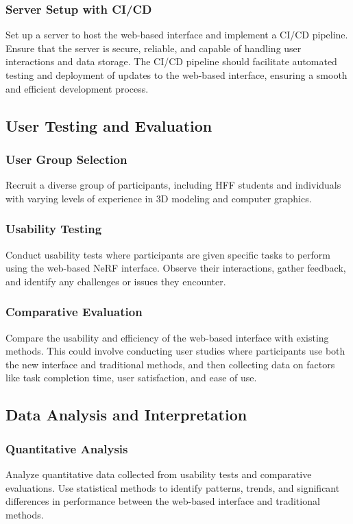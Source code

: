 \subsubsection{Server Setup with CI/CD}
Set up a server to host the web-based interface and implement a CI/CD pipeline. Ensure that the server is secure, reliable, and capable of handling user interactions and data storage. The CI/CD pipeline should facilitate automated testing and deployment of updates to the web-based interface, ensuring a smooth and efficient development process.

\subsection{User Testing and Evaluation}

\subsubsection{User Group Selection}
Recruit a diverse group of participants, including HFF students and individuals with varying levels of experience in 3D modeling and computer graphics.

\subsubsection{Usability Testing}
Conduct usability tests where participants are given specific tasks to perform using the web-based NeRF interface. Observe their interactions, gather feedback, and identify any challenges or issues they encounter.

\subsubsection{Comparative Evaluation}
Compare the usability and efficiency of the web-based interface with existing methods. This could involve conducting user studies where participants use both the new interface and traditional methods, and then collecting data on factors like task completion time, user satisfaction, and ease of use.

\subsection{Data Analysis and Interpretation}

\subsubsection{Quantitative Analysis}
Analyze quantitative data collected from usability tests and comparative evaluations. Use statistical methods to identify patterns, trends, and significant differences in performance between the web-based interface and traditional methods.

